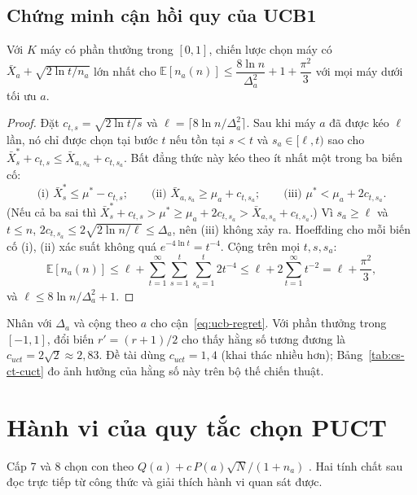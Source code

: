 \subsection{Chứng minh cận hồi quy của UCB1}
\begin{dinhly}
Với $K$ máy có phần thưởng trong $[0,1]$, chiến lược chọn máy có $\bar X_a+\sqrt{2\ln t/n_a}$ lớn nhất cho
$\mathbb E[n_a(n)]\le \dfrac{8\ln n}{\Delta_a^2}+1+\dfrac{\pi^2}{3}$ với mọi máy dưới tối ưu $a$.
\end{dinhly}
\begin{proof}
Đặt $c_{t,s}=\sqrt{2\ln t/s}$ và $\ell=\lceil 8\ln n/\Delta_a^2\rceil$. Sau khi máy $a$ đã được kéo $\ell$ lần,
nó chỉ được chọn tại bước $t$ nếu tồn tại $s<t$ và $s_a\in[\ell,t)$ sao cho
$\bar X^*_s+c_{t,s}\le \bar X_{a,s_a}+c_{t,s_a}$. Bất đẳng thức này kéo theo ít nhất một trong ba biến cố:
\[
  \text{(i) } \bar X^*_s\le\mu^*-c_{t,s};\qquad \text{(ii) } \bar X_{a,s_a}\ge\mu_a+c_{t,s_a};\qquad
  \text{(iii) } \mu^*<\mu_a+2c_{t,s_a}.
\]
(Nếu cả ba sai thì $\bar X^*_s+c_{t,s}>\mu^*\ge\mu_a+2c_{t,s_a}>\bar X_{a,s_a}+c_{t,s_a}$.) Vì $s_a\ge\ell$ và
$t\le n$, $2c_{t,s_a}\le 2\sqrt{2\ln n/\ell}\le\Delta_a$, nên (iii) không xảy ra. Hoeffding cho mỗi biến cố (i),
(ii) xác suất không quá $e^{-4\ln t}=t^{-4}$. Cộng trên mọi $t,s,s_a$:
\[
  \mathbb E[n_a(n)]\le\ell+\sum_{t=1}^{\infty}\sum_{s=1}^{t}\sum_{s_a=1}^{t}2t^{-4}
  \le\ell+2\sum_{t=1}^{\infty}t^{-2}=\ell+\frac{\pi^2}{3},
\]
và $\ell\le 8\ln n/\Delta_a^2+1$.
\end{proof}
Nhân với $\Delta_a$ và cộng theo $a$ cho cận~\eqref{eq:ucb-regret}. Với phần thưởng trong $[-1,1]$, đổi biến
$r'=(r+1)/2$ cho thấy hằng số tương đương là $c_{uct}=2\sqrt2\approx2{,}83$. Đề tài dùng $c_{uct}=1{,}4$ (khai
thác nhiều hơn); Bảng~\ref{tab:cs-ct-cuct} đo ảnh hưởng của hằng số này trên bộ thế chiến thuật.

\section{Hành vi của quy tắc chọn PUCT}
\label{sec:cs-puct-lt}
Cấp 7 và 8 chọn con theo $Q(a)+c\,P(a)\sqrt{N}/(1+n_a)$ \cite{rosin2011puct,silver2017alphagozero}. Hai tính chất
sau đọc trực tiếp từ công thức và giải thích hành vi quan sát được.

